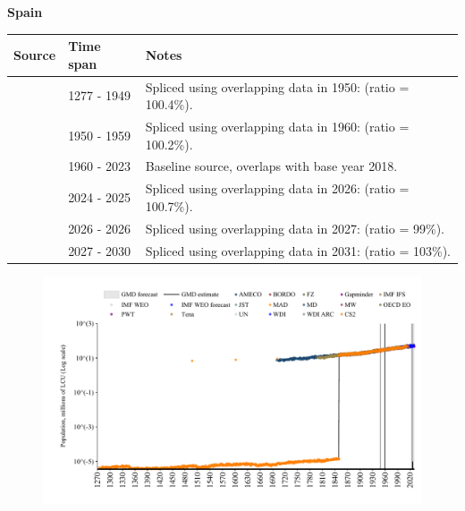 \documentclass[12pt,a4paper,landscape]{article}
\begin{document}
\begin{adjustbox}{max totalsize={\paperwidth}{\paperheight},center}
\begin{minipage}[t][\textheight][t]{\textwidth}
\vspace*{0.5cm}
{}
\begin{center}
{\Large\bfseries Spain}
\end{center}
\vspace{0.5cm}
\begin{table}[H]
\centering
\small
\begin{tabular}{|l|l|l|}
\hline
\textbf{Source} & \textbf{Time span} & \textbf{Notes} \\
\hline
\rowcolor{white}\cite{CS2_ESP}& 1277 - 1949 &Spliced using overlapping data in 1950: (ratio = 100.4\%).\\
\rowcolor{lightgray}\cite{IMF_IFS}& 1950 - 1959 &Spliced using overlapping data in 1960: (ratio = 100.2\%).\\
\rowcolor{white}\cite{WDI}& 1960 - 2023 &Baseline source, overlaps with base year 2018.\\
\rowcolor{lightgray}\cite{OECD_EO}& 2024 - 2025 &Spliced using overlapping data in 2026: (ratio = 100.7\%).\\
\rowcolor{white}\cite{AMECO}& 2026 - 2026 &Spliced using overlapping data in 2027: (ratio = 99\%).\\
\rowcolor{lightgray}\cite{Gapminder}& 2027 - 2030 &Spliced using overlapping data in 2031: (ratio = 103\%).\\
\hline
\end{tabular}
\end{table}
\begin{figure}[H]
\centering
\includegraphics[width=\textwidth,height=0.6\textheight,keepaspectratio]{graphs/ESP_pop.pdf}
\end{figure}
\end{minipage}
\end{adjustbox}
\end{document}

